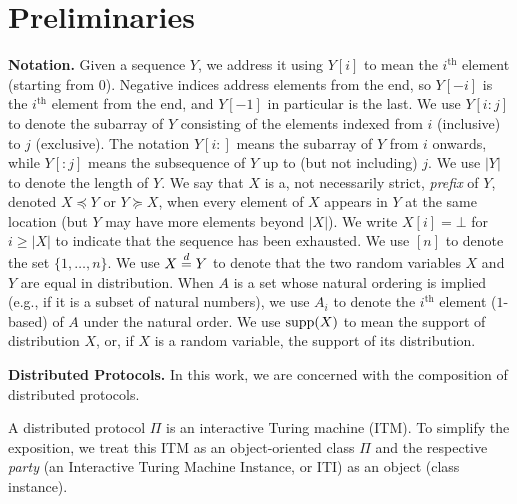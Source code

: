 \section{Preliminaries}

\noindent
\textbf{Notation.}
Given a sequence $Y$, we address it using $Y[i]$ to mean the $i^\text{th}$ element (starting from $0$).
Negative indices address elements from the end, so $Y[-i]$ is the $i^\text{th}$ element from
the end, and $Y[-1]$ in particular is the last. We use $Y[i{:}j]$ to denote the subarray of $Y$
consisting of the elements indexed from $i$ (inclusive) to $j$ (exclusive). The notation $Y[i{:}]$ means the
subarray of $Y$ from $i$ onwards, while $Y[{:}j]$ means the subsequence of $Y$ up to (but not including) $j$.
We use $|Y|$ to denote the length of $Y$.
We say that $X$ is a, not necessarily strict,
\emph{prefix} of $Y$, denoted $X \preceq Y$
or $Y \succeq X$,
when every element of $X$ appears in $Y$ at the
same location (but $Y$ may have more elements beyond $|X|$).
We write $X[i] = \bot$ for $i \geq |X|$ to indicate that the sequence
has been exhausted.
We use $[n]$ to denote the set $\{1, \ldots, n\}$.
We use $X \distreq Y$ to denote that the two random variables $X$ and $Y$
are equal in distribution.
When $A$ is a set whose natural ordering is implied (e.g., if it is a subset
of natural numbers), we use $A_i$ to denote the $i^\text{th}$ element ($1$-based)
of $A$ under the natural order.
We use $\operatorname{supp}(X)$ to mean the support of distribution $X$,
or, if $X$ is a random variable, the support of its distribution.

\noindent
\textbf{Distributed Protocols.}
In this work, we are concerned with the composition of distributed
protocols.

A distributed protocol $\Pi$ is an interactive Turing machine (ITM).
To simplify the exposition, we treat this ITM
as an object-oriented class $\Pi$ and the respective \emph{party}
(an Interactive Turing Machine Instance, or ITI) as an object (class instance).

